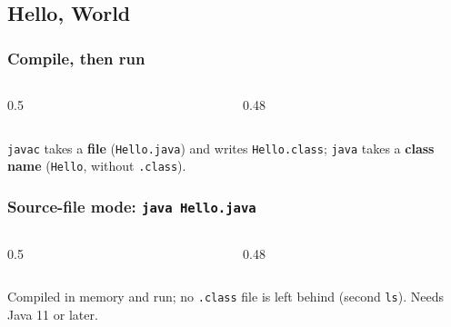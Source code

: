 \documentclass[aspectratio=169,10pt,compress]{beamer}
\begin{document}

\subsection[Hello]{Hello, World}




\begin{frame}[t,fragile] \frametitle{Compile, then run}
  \begin{columns}[T]
    \begin{column}{0.5\textwidth}
    \end{column}
    \begin{column}{0.48\textwidth}
    \end{column}
  \end{columns}

  \vspace{0.1em}
  \small \texttt{javac} takes a \textbf{file} (\texttt{Hello.java}) and writes \texttt{Hello.class}; \texttt{java} takes a
  \textbf{class name} (\texttt{Hello}, without \texttt{.class}).
\end{frame}




\begin{frame}[t,fragile] \frametitle{Source-file mode: \texttt{java Hello.java}}
  \begin{columns}[T]
    \begin{column}{0.5\textwidth}
    \end{column}
    \begin{column}{0.48\textwidth}
    \end{column}
  \end{columns}

  \vspace{0.1em}
  \small Compiled in memory and run; no \texttt{.class} file is left behind (second \texttt{ls}). Needs Java 11 or later.
\end{frame}
\end{document}
